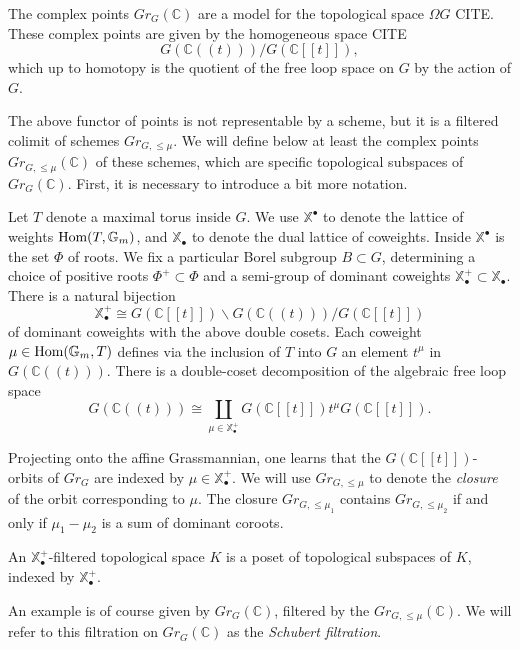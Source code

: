 The complex points $Gr_G(\mathbb{C})$ are a model for the topological space $\Omega G$ CITE.  These complex points are given by the homogeneous space CITE
$$G(\mathbb{C}((t)))/G(\mathbb{C}[[t]]),$$
which up to homotopy is the quotient of the free loop space on $G$ by the action of $G$.

The above functor of points is not representable by a scheme, but it is a filtered colimit of schemes $Gr_{G,\le \mu}$.  We will define below at least the complex points $Gr_{G, \le \mu}(\mathbb{C})$ of these schemes, which are specific topological subspaces of $Gr_G(\mathbb{C})$.  First, it is necessary to introduce a bit more notation.

Let $T$ denote a maximal torus inside $G$.  We use $\mathbb{X}^{\bullet}$ to denote the lattice of weights $\operatorname{\text{Hom}}(T,\mathbb{G}_m)$, and $\mathbb{X}_{\bullet}$ to denote the dual lattice of coweights.  Inside $\mathbb{X}^{\bullet}$ is the set $\Phi$ of roots.  We fix a particular Borel subgroup $B \subset G$, determining a choice of positive roots $\Phi^+ \subset \Phi$ and a semi-group of dominant coweights $\mathbb{X}^+_\bullet \subset \mathbb{X}_\bullet$.  There is a natural bijection
$$\mathbb{X}_{\bullet}^+ \cong G(\mathbb{C}[[t]])\backslash G(\mathbb{C}((t)))/G(\mathbb{C}[[t]])$$
of dominant coweights with the above double cosets.  Each coweight $\mu \in \operatorname{\text{Hom}}(\mathbb{G}_m,T)$ defines via the inclusion of $T$ into $G$ an element $t^{\mu}$ in $G(\mathbb{C}((t)))$.  There is a double-coset decomposition of the algebraic free loop space
$$
G(\mathbb{C}((t))) \cong \coprod_{\mu \in \mathbb{X}_{\bullet}^+} G(\mathbb{C}[[t]]) t^{\mu} G(\mathbb{C}[[t]]).
$$

Projecting onto the affine Grassmannian, one learns that the $G(\mathbb{C}[[t]])$-orbits of $Gr_G$ are indexed by $\mu \in \mathbb{X}_{\bullet}^+$.
We will use $Gr_{G,\le \mu}$ to denote the \textit{closure} of the orbit corresponding to $\mu$.  The closure $Gr_{G, \le \mu_1}$ contains $Gr_{G, \le \mu_2}$ if and only if $\mu_1-\mu_2$ is a sum of dominant coroots.

\begin{dfn} \label{def:coweightfiltered}
An $\mathbb{X}_{\bullet}^+$-filtered topological space $K$ is a poset of topological subspaces of $K$, indexed by $\mathbb{X}_{\bullet}^+$.
\end{dfn}

An example is of course given by $Gr_{G}(\mathbb{C})$, filtered by the $Gr_{G,\le \mu}(\mathbb{C})$.  We will refer to this filtration on $Gr_{G}(\mathbb{C})$ as the \textit{Schubert filtration}.

